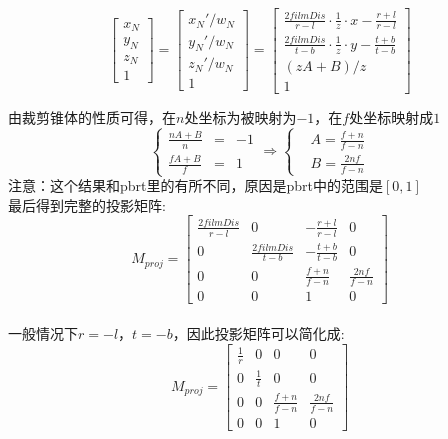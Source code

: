 \begin{displaymath}
\begin{bmatrix}
x_N\\
y_N\\
z_N\\
1
\end{bmatrix} = 
\begin{bmatrix}
x_N'/w_N\\
y_N'/w_N\\
z_N'/w_N\\
1
\end{bmatrix} = 
\begin{bmatrix}
\frac{2filmDis}{r - l}\cdot\frac{1}{z}\cdot x - \frac{r + l}{r - l}\\
\frac{2filmDis}{t - b}\cdot\frac{1}{z}\cdot y - \frac{t + b}{t - b}\\
(zA + B) / z \\
1
\end{bmatrix}
\end{displaymath}

由裁剪锥体的性质可得，在$n$处坐标为被映射为$-1$，在$f$处坐标映射成$1$
\begin{displaymath}
\left\{
\begin{aligned}{}
\frac{nA + B}{n} & = & -1\\
\frac{fA + B}{f} & = & 1
\end{aligned}
\right.
\Rightarrow
\left\{
\begin{aligned}
&A = \frac{f + n}{f - n}\\
&B = \frac{2nf}{f - n}
\end{aligned}
\right.
\end{displaymath}
注意：这个结果和pbrt里的有所不同，原因是pbrt中的范围是$[0,1]$
\\

最后得到完整的投影矩阵:
\begin{displaymath}
M_{proj} = 
\begin{bmatrix}
\frac{2filmDis}{r - l} & 0 & -\frac{r + l}{r - l} & 0\\
0 & \frac{2filmDis}{t - b} & -\frac{t + b}{t - b} & 0\\
0 & 0 & \frac{f + n}{f - n} & \frac{2nf}{f - n}\\
0 & 0 & 1 & 0
\end{bmatrix}
\end{displaymath}
\\

一般情况下$r = -l$，$t = -b$，因此投影矩阵可以简化成:
\begin{displaymath}
M_{proj} = 
\begin{bmatrix}
\frac{1}{r} & 0 & 0 & 0\\
0 & \frac{1}{t} & 0 & 0\\
0 & 0 & \frac{f + n}{f - n} & \frac{2nf}{f - n}\\
0 & 0 & 1 & 0
\end{bmatrix}
\end{displaymath}